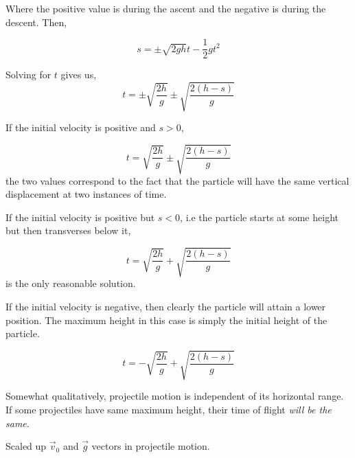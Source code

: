 Where the positive value is during the ascent and the negative is during the descent. Then,

\[s = \pm\sqrt{2gh}t - \frac{1}{2}gt^2\]

Solving for \(t\) gives us,
\[t = \pm \sqrt{\frac{2h}{g}} \pm \sqrt{\frac{2(h-s)}{g}}\]

If the initial velocity is positive and \(s > 0\), 

\begin{equation}
    t = \sqrt{\frac{2h}{g}} \pm \sqrt{\frac{2(h-s)}{g}}
\end{equation}
the two values correspond to the fact that the particle will have the same vertical
displacement at two instances of time.

If the initial velocity is positive but \(s < 0\), i.e the particle 
starts at some height but then transverses below it, 

\begin{equation}
    t = \sqrt{\frac{2h}{g}} + \sqrt{\frac{2(h-s)}{g}}
\end{equation}
is the only reasonable solution.

If the initial velocity is negative, then clearly the 
particle will attain a lower position. The maximum height in this 
case is simply the initial height of the particle.

\begin{equation}
    t = - \sqrt{\frac{2h}{g}} + \sqrt{\frac{2(h-s)}{g}}
\end{equation}

Somewhat qualitatively, projectile motion is independent of its horizontal range. 
If some projectiles have same maximum height, their time of flight \emph{will be the 
same}.

\begin{marginfigure}
    \vspace{15em}
    \centering
    \caption{Scaled up \(\vec{v}_0\) and \(\vec{g}\) vectors in projectile motion.}
    \label{fig: rangewithvectors}
\end{marginfigure}

